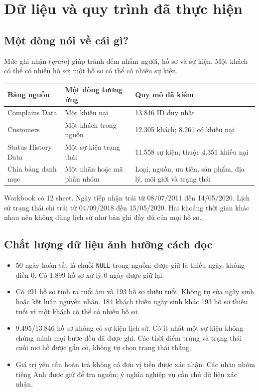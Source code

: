 \documentclass[11pt,a4paper]{article}
\begin{document}
\section{Dữ liệu và quy trình đã thực hiện}
\subsection*{Một dòng nói về cái gì?}
Mức ghi nhận (\textit{grain}) giúp tránh đếm nhầm người, hồ sơ và sự kiện. Một khách có thể có nhiều hồ sơ; một hồ sơ có thể có nhiều sự kiện.

\begin{tabularx}{\linewidth}{@{}L{3.5cm}L{4.1cm}Y@{}}
\toprule
\textbf{Bảng nguồn} & \textbf{Một dòng tương ứng} & \textbf{Quy mô đã kiểm}\\
\midrule
Complains Data & Một khiếu nại & 13.846 ID duy nhất\\
Customers & Một khách trong nguồn & 12.305 khách; 8.261 có khiếu nại\\
Status History Data & Một sự kiện trạng thái & 11.558 sự kiện; thuộc 4.351 khiếu nại\\
Chín bảng danh mục & Một nhãn hoặc mã phân nhóm & Loại, nguồn, ưu tiên, sản phẩm, địa lý, môi giới và trạng thái\\
\bottomrule
\end{tabularx}

Workbook có 12 sheet. Ngày tiếp nhận trải từ 08/07/2011 đến 14/05/2020. Lịch sử trạng thái chỉ trải từ 04/09/2018 đến 15/05/2020. Hai khoảng thời gian khác nhau nên không dùng lịch sử như bản ghi đầy đủ của mọi hồ sơ.

\subsection*{Chất lượng dữ liệu ảnh hưởng cách đọc}
\begin{itemize}
\item 50 ngày hoàn tất là chuỗi \texttt{NULL} trong nguồn; được giữ là thiếu ngày, không điền 0. Có 1.899 hồ sơ xử lý 0 ngày được giữ lại.
\item Có 491 hồ sơ tính ra tuổi âm và 193 hồ sơ thiếu tuổi. Không tự sửa ngày sinh hoặc kết luận nguyên nhân. 184 khách thiếu ngày sinh khác 193 hồ sơ thiếu tuổi vì một khách có thể có nhiều hồ sơ.
\item 9.495/13.846 hồ sơ không có sự kiện lịch sử. Có ít nhất một sự kiện không chứng minh mọi bước đều đã được ghi. Các thời điểm trùng và trạng thái cuối mơ hồ được gắn cờ, không tự chọn trạng thái thắng.
\item Giá trị yêu cầu hoàn trả không có đơn vị tiền được xác nhận. Các nhãn nhóm tiếng Anh được giữ để tra nguồn; ý nghĩa nghiệp vụ cần chủ dữ liệu xác nhận.
\end{itemize}
\end{document}
